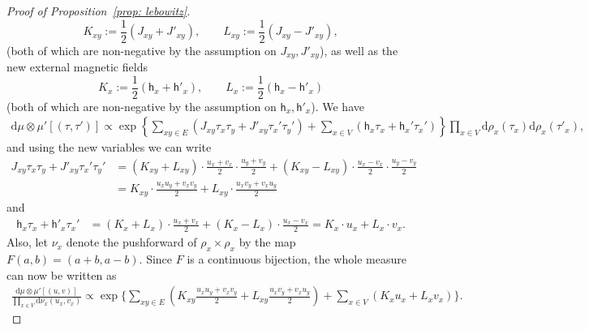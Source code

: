 \documentclass[11pt,a4paper]{article}
\numberwithin{equation}{section}
\theoremstyle{plain}
\theoremstyle{definition}
\begin{document}
\begin{proof}[Proof of Proposition~\textup{\ref{prop: lebowitz}}]
\begin{equation}
K_{xy} := \frac{1}{2}(J_{xy} + J'_{xy}), \qquad L_{xy} := \frac{1}{2}(J_{xy} - J'_{xy}),
\end{equation}
(both of which are non-negative by the assumption on $J_{xy}, J'_{xy}$), as well as the new external magnetic fields
\begin{equation}
K_x:=\frac{1}{2}(\mathsf{h}_x+\mathsf{h}'_x), \qquad L_x:= \frac{1}{2}(\mathsf{h}_x-\mathsf{h}'_x)
\end{equation}
(both of which are non-negative by the assumption on $\mathsf{h}_x,\mathsf{h}'_x$).
We have 
\begin{align*}
   \mathrm{d}\mu\otimes \mu'[(\tau, \tau')] \propto \exp\left\{ \sum_{xy\in E} (J_{xy} \tau_x \tau_y +J'_{xy}\tau_x'\tau_y') +\sum_{x\in V} (\mathsf{h}_x\tau_x+\mathsf{h}_x'\tau_x') \right\}\prod_{x\in V}\mathrm{d}\rho_x(\tau_x)\mathrm{d}\rho_x(\tau'_x),
\end{align*}
and using the new variables we can write 
\begin{align*}
J_{xy} \tau_x \tau_y +J'_{xy}\tau_x'\tau_y'
&=
(K_{xy}+L_{xy})\cdot \frac{u_x+v_x}{2}\cdot\frac{u_y+v_y}{2}+(K_{xy}-L_{xy})\cdot \frac{u_x-v_x}{2}\cdot\frac{u_y-v_y}{2}
\\&=
K_{xy}\cdot \frac{u_xu_y+v_xv_y}{2}+L_{xy}\cdot \frac{u_xv_y+v_xu_y}{2}
\end{align*}
and
\begin{align*}
\mathsf{h}_x \tau_x +\mathsf{h}'_x\tau_x'
&=
(K_x+L_x)\cdot \frac{u_x+v_x}{2}+(K_x-L_x)\cdot \frac{u_x-v_x}{2}=
K_x\cdot u_x+L_x\cdot v_x.
\end{align*}
Also, let $\nu_x$ denote the pushforward of $\rho_x\times \rho_x$ by the map $F(a,b)=\left(a+b,a-b\right)$.
Since $F$ is a continuous bijection, the whole measure can now be written as 
\begin{align}
\frac{\mathrm{d}\mu\otimes \mu'[(u, v)]}{\prod_{x\in V}\mathrm{d}\nu_x(u_x,v_x)}\propto \exp\Biggl\{\sum_{xy\in E} \left(K_{xy} \frac{u_xu_y+v_xv_y}{2}+L_{xy} \frac{u_xv_y+v_xu_y}{2}\right) +\sum_{x\in V}(K_xu_x+L_xv_x)\Biggr\}.
\end{align}




\end{proof}
\end{document}
